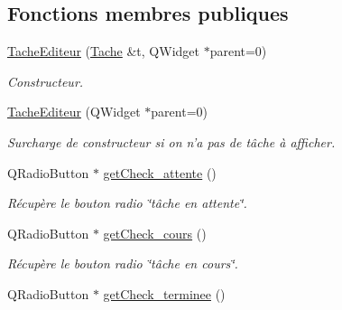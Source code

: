 \subsection*{Fonctions membres publiques}
\begin{DoxyCompactItemize}
\item 
\hyperlink{class_tache_editeur_a0a8293ff8440d43d354e87445518fe7b}{Tache\-Editeur} (\hyperlink{class_tache}{Tache} \&t, Q\-Widget $\ast$parent=0)
\begin{DoxyCompactList}\small\item\em Constructeur. \end{DoxyCompactList}\item 
\hypertarget{class_tache_editeur_aaa74a2bfef09f536de419b3ac47d91e5}{\hyperlink{class_tache_editeur_aaa74a2bfef09f536de419b3ac47d91e5}{Tache\-Editeur} (Q\-Widget $\ast$parent=0)}\label{class_tache_editeur_aaa74a2bfef09f536de419b3ac47d91e5}

\begin{DoxyCompactList}\small\item\em Surcharge de constructeur si on n'a pas de tâche à afficher. \end{DoxyCompactList}\item 
\hypertarget{class_tache_editeur_ab46e82dc71f4093879dd08b9012f98c7}{Q\-Radio\-Button $\ast$ \hyperlink{class_tache_editeur_ab46e82dc71f4093879dd08b9012f98c7}{get\-Check\-\_\-attente} ()}\label{class_tache_editeur_ab46e82dc71f4093879dd08b9012f98c7}

\begin{DoxyCompactList}\small\item\em Récupère le bouton radio \char`\"{}tâche en attente\char`\"{}. \end{DoxyCompactList}\item 
\hypertarget{class_tache_editeur_a5a00a29449595fb0c38d5d8eee2500e5}{Q\-Radio\-Button $\ast$ \hyperlink{class_tache_editeur_a5a00a29449595fb0c38d5d8eee2500e5}{get\-Check\-\_\-cours} ()}\label{class_tache_editeur_a5a00a29449595fb0c38d5d8eee2500e5}

\begin{DoxyCompactList}\small\item\em Récupère le bouton radio \char`\"{}tâche en cours\char`\"{}. \end{DoxyCompactList}\item 
\hypertarget{class_tache_editeur_a898e7562d643a300fa85113baed41a5b}{Q\-Radio\-Button $\ast$ \hyperlink{class_tache_editeur_a898e7562d643a300fa85113baed41a5b}{get\-Check\-\_\-terminee} ()}\label{class_tache_editeur_a898e7562d643a300fa85113baed41a5b}


\end{DoxyCompactItemize}
